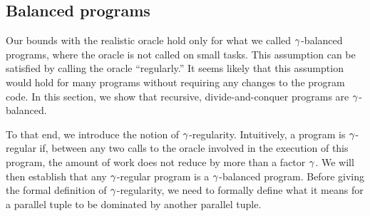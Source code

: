 


\subsection{Balanced programs}
\label{sec:balanced}

Our bounds with the realistic oracle hold only for what we called
${\gamma}$-balanced programs, where the oracle is not called on small
tasks.  This assumption can be satisfied by calling the oracle
``regularly.''  It seems likely that this assumption would hold for
many programs without requiring any changes to the program code.  In
this section, we show that recursive, divide-and-conquer programs are
${\gamma}$-balanced.

To that end, we introduce the notion of ${\gamma}$-regularity.
Intuitively, a program is ${\gamma}$-regular if, between any two calls
to the oracle involved in the execution of this program,
the amount of work does not reduce by more than a factor ${\gamma}$.
We will then establish that any ${\gamma}$-regular program is 
a ${\gamma}$-balanced program.
Before giving the formal definition of ${\gamma}$-regularity,
we need to formally define what it means for a parallel tuple
to be dominated by another parallel tuple.

